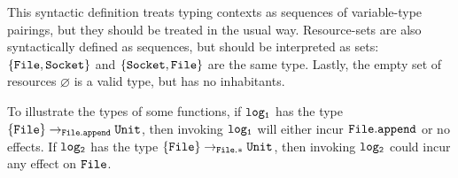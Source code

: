 This syntactic definition treats typing contexts as sequences of variable-type pairings, but they should be treated in the usual way. Resource-sets are also syntactically defined as sequences, but should be interpreted as sets: $\{ \mathtt{File, Socket} \}$ and $\{ \mathtt{Socket, File} \}$ are the same type. Lastly, the empty set of resources $\varnothing$ is a valid type, but has no inhabitants.

To illustrate the types of some functions, if $\mathtt{log_1}$ has the type $\{ \mathtt{File} \} \rightarrow_{\mathtt{File.append}} \mathtt{Unit}$, then invoking $\mathtt{log_1}$ will either incur $\mathtt{File.append}$ or no effects. If $\mathtt{log_2}$ has the type $\{ \mathtt{File} \} \rightarrow_{\mathtt{File.*}} \mathtt{Unit}$, then invoking $\mathtt{log_2}$ could incur any effect on $\mathtt{File}$.


